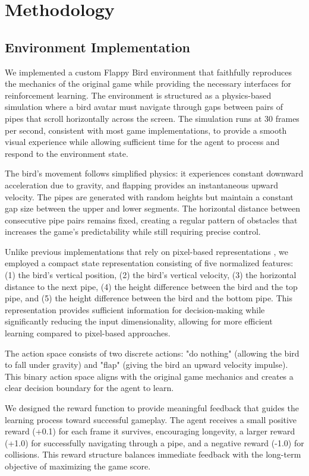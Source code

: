 \section{Methodology}

\subsection{Environment Implementation}

We implemented a custom Flappy Bird environment that faithfully reproduces the mechanics of the original game while providing the necessary interfaces for reinforcement learning. The environment is structured as a physics-based simulation where a bird avatar must navigate through gaps between pairs of pipes that scroll horizontally across the screen. The simulation runs at 30 frames per second, consistent with most game implementations, to provide a smooth visual experience while allowing sufficient time for the agent to process and respond to the environment state.

The bird's movement follows simplified physics: it experiences constant downward acceleration due to gravity, and flapping provides an instantaneous upward velocity. The pipes are generated with random heights but maintain a constant gap size between the upper and lower segments. The horizontal distance between consecutive pipe pairs remains fixed, creating a regular pattern of obstacles that increases the game's predictability while still requiring precise control.

Unlike previous implementations that rely on pixel-based representations \cite{yang2023foundation}, we employed a compact state representation consisting of five normalized features: (1) the bird's vertical position, (2) the bird's vertical velocity, (3) the horizontal distance to the next pipe, (4) the height difference between the bird and the top pipe, and (5) the height difference between the bird and the bottom pipe. This representation provides sufficient information for decision-making while significantly reducing the input dimensionality, allowing for more efficient learning compared to pixel-based approaches.

The action space consists of two discrete actions: "do nothing" (allowing the bird to fall under gravity) and "flap" (giving the bird an upward velocity impulse). This binary action space aligns with the original game mechanics and creates a clear decision boundary for the agent to learn.

We designed the reward function to provide meaningful feedback that guides the learning process toward successful gameplay. The agent receives a small positive reward (+0.1) for each frame it survives, encouraging longevity, a larger reward (+1.0) for successfully navigating through a pipe, and a negative reward (-1.0) for collisions. This reward structure balances immediate feedback with the long-term objective of maximizing the game score.

